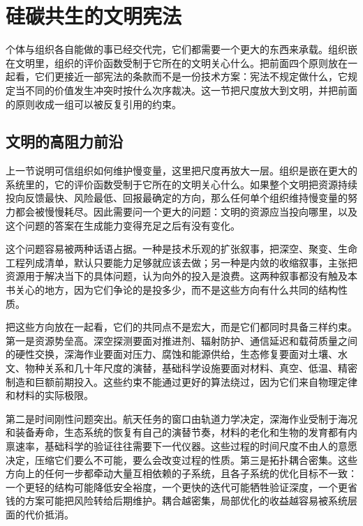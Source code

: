 \section{硅碳共生的文明宪法}

个体与组织各自能做的事已经交代完，它们都需要一个更大的东西来承载。组织嵌在文明里，组织的评价函数受制于它所在的文明关心什么。把前面四个原则放在一起看，它们更接近一部宪法的条款而不是一份技术方案：宪法不规定做什么，它规定当不同的价值发生冲突时按什么次序裁决。这一节把尺度放大到文明，并把前面的原则收成一组可以被反复引用的约束。

\subsection{文明的高阻力前沿}


上一节说明可信组织如何维护慢变量，这里把尺度再放大一层。组织是嵌在更大的系统里的，它的评价函数受制于它所在的文明关心什么。如果整个文明把资源持续投向反馈最快、风险最低、回报最确定的方向，那么任何单个组织维持慢变量的努力都会被慢慢耗尽。因此需要问一个更大的问题：文明的资源应当投向哪里，以及这个问题的答案在生成能力变得充足之后有没有变化。

这个问题容易被两种话语占据。一种是技术乐观的扩张叙事，把深空、聚变、生命工程列成清单，默认只要能力足够就应该去做；另一种是内敛的收缩叙事，主张把资源用于解决当下的具体问题，认为向外的投入是浪费。这两种叙事都没有触及本书关心的地方，因为它们争论的是投多少，而不是这些方向有什么共同的结构性质。


把这些方向放在一起看，它们的共同点不是宏大，而是它们都同时具备三样约束。第一是资源势垒高。深空探测要面对推进剂、辐射防护、通信延迟和载荷质量之间的硬性交换，深海作业要面对压力、腐蚀和能源供给，生态修复要面对土壤、水文、物种关系和几十年尺度的演替，基础科学设施要面对材料、真空、低温、精密制造和巨额前期投入。这些约束不能通过更好的算法绕过，因为它们来自物理定律和材料的实际极限。

第二是时间刚性问题突出。航天任务的窗口由轨道力学决定，深海作业受制于海况和装备寿命，生态系统的恢复有自己的演替节奏，材料的老化和生物的发育都有内禀速率，基础科学的验证往往需要下一代仪器。这些过程的时间尺度不由人的意愿决定，压缩它们要么不可能，要么会改变过程的性质。第三是拓扑耦合密集。这些方向上的任何一步都牵动大量互相依赖的子系统，且各子系统的优化目标不一致：一个更轻的结构可能降低安全裕度，一个更快的迭代可能牺牲验证深度，一个更省钱的方案可能把风险转给后期维护。耦合越密集，局部优化的收益越容易被系统层面的代价抵消。

